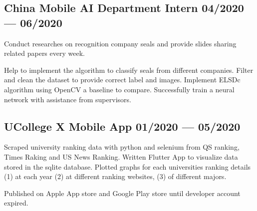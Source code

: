 

\subsection{{
    China Mobile AI Department Intern
    \hfill 04/2020 --- 06/2020
}}
\begin{zitemize}
    \item   Conduct researches on recognition company seals and provide slides sharing
            related papers every week. 
    \item   Help to implement the algorithm to classify seals from different companies.
            Filter and clean the dataset to provide correct label and images. 
            Implement ELSDc algorithm using OpenCV a baseline to compare. 
            Successfully train a neural network with assistance from supervisors.
\end{zitemize}


\subsection{{
    UCollege X Mobile App
    \hfill 01/2020 --- 05/2020
}}
\begin{zitemize}
    \item   Scraped university ranking data with python and selenium from QS ranking,
            Times Raking and US News Ranking.
            Written Flutter App to visualize data stored in the sqlite database.
            Plotted graphs for each universities ranking details (1) at each year
            (2) at different ranking websites, (3) of different majors.
    \item   Published on Apple App store and Google Play store until developer account expired.
\end{zitemize}
